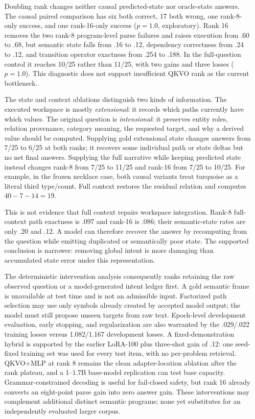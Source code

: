 \documentclass[11pt]{article}
\begin{document}
Doubling rank changes neither causal predicted-state nor oracle-state answers.
The causal paired comparison has six both correct, 17 both wrong, one rank-8-only
success, and one rank-16-only success ($p=1.0$, exploratory). Rank 16 removes the
two rank-8 program-level parse failures and raises execution from .60 to .68,
but semantic state falls from .16 to .12, dependency correctness from .24 to
.12, and transition operator exactness from .254 to .188. In the full-question
control it reaches 10/25 rather than 11/25, with two gains and three losses
($p=1.0$). This diagnostic does not support insufficient QKVO rank as the
current bottleneck.

The state and context ablations distinguish two kinds of information. The
executed workspace is mostly \emph{extensional}: it records which paths currently
have which values. The original question is \emph{intensional}: it preserves
entity roles, relation provenance, category meaning, the requested target, and
why a derived value should be computed. Supplying gold extensional state changes
answers from 7/25 to 6/25 at both ranks; it recovers some individual path or
state deltas but no net final answers. Supplying the full narrative while keeping
predicted state instead changes rank-8 from 7/25 to 11/25 and rank-16 from 7/25
to 10/25. For example, in the frozen necklace case, both causal variants treat
turquoise as a literal third type/count. Full context restores the residual
relation and computes $40-7-14=19$.

This is not evidence that full context repairs workspace integration. Rank-8
full-context path exactness is .097 and rank-16 is .086; their semantic-state
rates are only .20 and .12. A model can therefore recover the answer by
recomputing from the question while emitting duplicated or semantically poor
state. The supported conclusion is narrower: removing global intent is more
damaging than accumulated state error under this representation.

The deterministic intervention analysis consequently ranks retaining the raw
observed question or a model-generated intent ledger first. A gold semantic
frame is unavailable at test time and is not an admissible input. Factorized
path selection may use only symbols already created by accepted model output;
the model must still propose unseen targets from raw text. Epoch-level
development evaluation, early stopping,
and regularization are also warranted by the .029/.022 training losses versus
1.082/1.167 development losses. A fixed-demonstration hybrid is supported by the
earlier LoRA-100 plus three-shot gain of .12: one seed-fixed training set was
used for every test item, with no per-problem retrieval. QKVO+MLP at rank 8 remains the
clean adapter-location ablation after the rank plateau, and a 1--1.7B base-model
replication can test base capacity. Grammar-constrained decoding is useful for
fail-closed safety, but rank 16 already converts an eight-point parse gain into
zero answer gain. These interventions may complement additional distinct
semantic programs; none yet substitutes for an independently evaluated larger
corpus.
\end{document}
